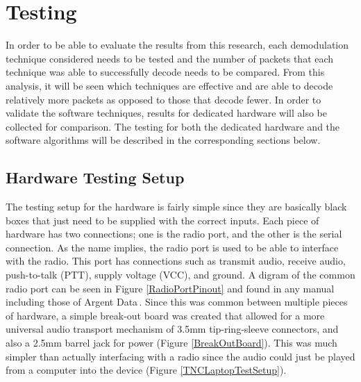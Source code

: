 \chapter{Testing}
In order to be able to evaluate the results from this research, each demodulation technique considered needs to be tested and the number of packets that each technique was able to successfully decode needs to be compared. From this analysis, it will be seen which techniques are effective and are able to decode relatively more packets as opposed to those that decode fewer. In order to validate the software techniques, results for dedicated hardware will also be collected for comparison. The testing for both the dedicated hardware and the software algorithms will be described in the corresponding sections below.

\section{Hardware Testing Setup}
The testing setup for the hardware is fairly simple since they are basically black boxes that just need to be supplied with the correct inputs. Each piece of hardware has two connections; one is the radio port, and the other is the serial connection. As the name implies, the radio port is used to be able to interface with the radio. This port has connections such as transmit audio, receive audio, push-to-talk (PTT), supply voltage (VCC), and ground. A digram of the common radio port can be seen in Figure \ref{RadioPortPinout} and found in any manual including those of Argent Data\,\cite{Systems2013}. Since this was common between multiple pieces of hardware, a simple break-out board was created that allowed for a more universal audio transport mechanism of 3.5mm tip-ring-sleeve connectors, and also a 2.5mm barrel jack for power (Figure \ref{BreakOutBoard}). This was much simpler than actually interfacing with a radio since the audio could just be played from a computer into the device (Figure \ref{TNCLaptopTestSetup}). 


